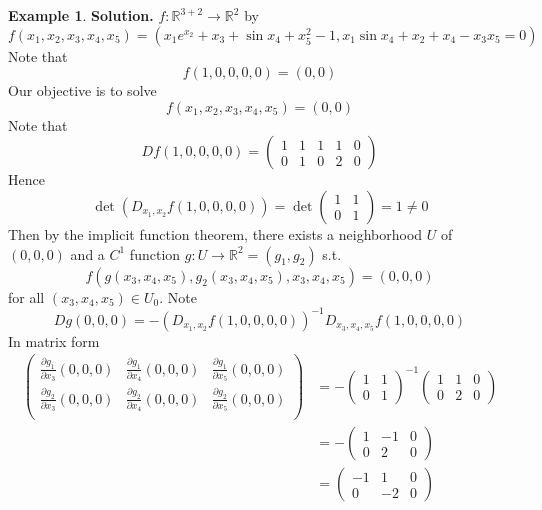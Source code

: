 \documentclass[11pt,openany]{book}
\theoremstyle{plain}
\theoremstyle{definition}
\newtheorem{example}{Example}[chapter]
\theoremstyle{remark}
\newcommand{\R}{\mathbb{R}}
\begin{document}
\begin{example}
    \textbf{Solution.} $f \colon \R^{3+2} \to \R^2$ by 
    $$f(x_1, x_2, x_3, x_4, x_5) = (x_1 e^{x_2} + x_3 + \sin x_4 + x_5^2 - 1, x_1 \sin x_4 + x_2 + x_4 - x_3 x_5 = 0)$$
    Note that 
    $$f(1,0,0,0,0) = (0,0)$$
    Our objective is to solve 
    $$f(x_1, x_2, x_3, x_4, x_5) = (0,0)$$
    Note that 
    $$Df(1,0,0,0,0) = \begin{pmatrix}
        1 & 1 & 1 & 1 & 0 \\
        0 & 1 & 0 & 2 & 0
    \end{pmatrix}$$
    Hence 
    $$\det (D_{x_1, x_2}f (1,0,0,0,0)) = \det \begin{pmatrix}
        1 & 1 \\ 0 & 1
    \end{pmatrix} = 1 \ne 0$$
    Then by the implicit function theorem, there exists a neighborhood $U$ of $(0,0,0)$ and a $C^1$ function 
    $g \colon U \to \R^2 = (g_1, g_2)$ s.t. 
    $$f(g(x_3, x_4, x_5), g_2(x_3, x_4, x_5), x_3, x_4, x_5) = (0,0,0)$$
    for all $(x_3, x_4, x_5) \in U_0$. Note 
    $$Dg(0,0,0) = - (D_{x_1, x_2}f (1,0,0,0,0))^{-1} D_{x_3,x_4,x_5} f(1,0,0,0,0)$$
    In matrix form 
    \begin{align*}
        \begin{pmatrix}
            \frac{\partial g_1}{\partial x_3}(0,0,0) & \frac{\partial g_1}{\partial x_4}(0,0,0) & \frac{\partial g_1}{\partial x_5}(0,0,0) \\ 
            \frac{\partial g_2}{\partial x_3} (0,0,0)& \frac{\partial g_2}{\partial x_4}(0,0,0) & \frac{\partial g_2}{\partial x_5}(0,0,0) \\ 
        \end{pmatrix} &= - \begin{pmatrix}
            1 & 1 \\ 
            0 & 1
        \end{pmatrix}^{-1} \begin{pmatrix}
            1 & 1 & 0 \\
            0 & 2 & 0
        \end{pmatrix} \\
        &= - \begin{pmatrix}
            1 & -1 & 0 \\
            0 & 2 & 0 
        \end{pmatrix} \\
        &= \begin{pmatrix}
            -1 & 1 & 0 \\
            0 & -2 & 0
        \end{pmatrix}
    \end{align*} 
\end{example}
\end{document}
